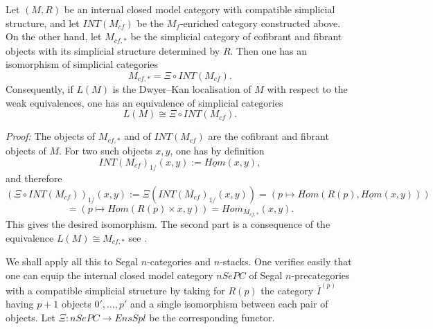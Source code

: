 \begin{lemma}
\label{splinterne}
Let $(M,R)$ be an internal closed model category with compatible
simplicial structure, and let $INT(M_{cf})$ be the $M_f$-enriched category
constructed above. On the other hand, let $M_{cf,\ast}$ be the simplicial
category of cofibrant and fibrant objects with its simplicial structure
determined by $R$. Then one has an isomorphism of simplicial categories
$$
M_{cf, \ast} = \Xi \circ  INT(M_{cf}).
$$
Consequently, if $L(M)$ is the Dwyer--Kan localisation of $M$ with respect to
the weak equivalences, one has an equivalence of simplicial categories
$$
L(M)\cong \Xi \circ INT(M_{cf}).
$$
\end{lemma}
{\em Proof:}
The objects of $M_{cf, \ast}$ and of $INT(M_{cf})$ are the cofibrant and
fibrant objects of $M$. For two such objects $x,y$, one has by definition
$$
INT(M_{cf})_{1/}(x,y):= \underline{Hom}(x,y),
$$
and therefore
$$
(\Xi \circ INT(M_{cf}))_{1/}(x,y):= \Xi (INT(M_{cf})_{1/}(x,y))
= \left( p\mapsto Hom (R(p), \underline{Hom}(x,y)) \right)
$$
$$
= \left( p\mapsto Hom (R(p)\times x,y) \right)
= Hom _{M_{cf, \ast}}(x,y).
$$
This gives the desired isomorphism. The second part is a consequence
of the equivalence $L(M) \cong M_{cf, \ast}$ see \cite{DwyerKan2}.
\eop

We shall apply all this to Segal $n$-categories and $n$-stacks.
One verifies easily that one can equip the
internal closed model category $nSePC$ of Segal $n$-precategories
with a compatible simplicial structure by taking for $R(p)$
the category $\overline{I}^{(p)}$
having $p+1$ objects $0',\ldots , p'$
and a single isomorphism between each pair of objects. Let
$\Xi : nSePC \rightarrow EnsSpl$ be the corresponding functor.

